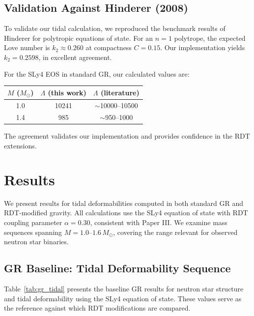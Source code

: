\documentclass[twocolumn,showpacs,preprintnumbers,amsmath,amssymb,prd]{revtex4-2}
\begin{document}
\subsection{Validation Against Hinderer (2008)}
\label{sec:methods_validation}

To validate our tidal calculation, we reproduced the benchmark results of Hinderer \cite{Hinderer2008} for polytropic equations of state. For an $n = 1$ polytrope, the expected Love number is $k_2 \approx 0.260$ at compactness $C = 0.15$. Our implementation yields $k_2 = 0.2598$, in excellent agreement.

For the SLy4 EOS in standard GR, our calculated values are:
\begin{center}
\begin{tabular}{ccc}
\hline
$M$ ($M_\odot$) & $\Lambda$ (this work) & $\Lambda$ (literature) \\
\hline
1.0 & 10241 & $\sim$10000--10500 \\
1.4 & 985 & $\sim$950--1000 \\
\hline
\end{tabular}
\end{center}
The agreement validates our implementation and provides confidence in the RDT extensions.


\section{Results}
\label{sec:results}

We present results for tidal deformabilities computed in both standard GR and RDT-modified gravity. All calculations use the SLy4 equation of state with RDT coupling parameter $\alpha = 0.30$, consistent with Paper III. We examine mass sequences spanning $M = 1.0$--$1.6\,M_\odot$, covering the range relevant for observed neutron star binaries.

\subsection{GR Baseline: Tidal Deformability Sequence}
\label{sec:results_gr}

Table~\ref{tab:gr_tidal} presents the baseline GR results for neutron star structure and tidal deformability using the SLy4 equation of state. These values serve as the reference against which RDT modifications are compared.
\end{document}
